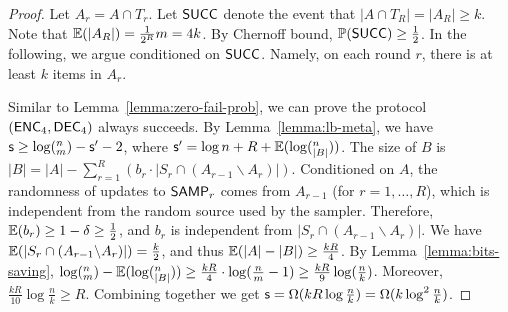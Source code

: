 \begin{proof}
  Let $A_r=A\cap T_r$. 
  Let $\textsf{SUCC}$ denote the event that $|A\cap T_R|=|A_R|\ge k$. 
  Note that $\operatorname*{\mathbb{E}}(|A_R|)=\frac{1}{2^R}m=4k$. By Chernoff bound, $\operatorname*{\mathbb{P}}(\textsf{SUCC})\ge \frac{1}{2}$. 
  In the following, we argue conditioned on $\textsf{SUCC}$. Namely, on each round $r$, there is at least $k$ items in $A_r$.  
  
  Similar to Lemma~\ref{lemma:zero-fail-prob}, we can prove the protocol $(\textsf{ENC}_4,\textsf{DEC}_4)$ always succeeds. 
  By Lemma~\ref{lemma:lb-meta}, we have $\textsf{s}\ge \log (^n_m) - \textsf{s}' -2$, where $\textsf{s}'=\log n + R+ \operatorname*{\mathbb{E}}(\log (^n_{|B|}))$. 
  The size of $B$ is $|B|=|A|-\sum_{r=1}^{R}{(b_r \cdot |S_r \cap (A_{r-1}\backslash A_r)|)}$.
  Conditioned on $A$, the randomness of updates to $\textsf{SAMP}_r$ comes from $A_{r-1}$ (for $r=1, \ldots, R$), which is independent from the random source used by the sampler.
  Therefore, $\operatorname*{\mathbb{E}}(b_r)\ge 1-\delta\ge \frac{1}{2}$, and $b_r$ is independent from $|S_r \cap (A_{r-1}\backslash A_r)|$. 
  We have $\operatorname*{\mathbb{E}}(|S_r \cap (A_{r-1}\backslash A_r)|)=\frac{k}{2}$, and thus $\operatorname*{\mathbb{E}}(|A|-|B|)\ge \frac{kR}{4}$. 
  By Lemma~\ref{lemma:bits-saving}, $\log (^n_m)-\operatorname*{\mathbb{E}}(\log (^n_{|B|}))\ge \frac{kR}{4}\cdot \log (\frac{n}{m}-1) \ge \frac{kR}{9}\log (\frac{n}{k})$.
  Moreover, $\frac{kR}{10}\log \frac{n}{k}\ge R$.  
  Combining together we get $\textsf{s} = \Omega(kR\log\frac{n}{k}) = \Omega(k\log^2 \frac{n}{k} )$.
\end{proof}
